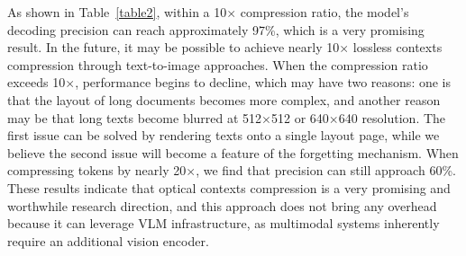 \documentclass[11pt, a4paper, logo, copyright, nonumbering]{deepseek}
\begin{document}
\begin{CJK*}{UTF8}{gbsn}
As shown in Table~\ref{table2}, within a 10$\times$ compression ratio, the model's decoding precision can reach approximately 97\%, which is a very promising result. In the future, it may be possible to achieve nearly 10$\times$ lossless contexts compression through text-to-image approaches. When the compression ratio exceeds 10$\times$, performance begins to decline, which may have two reasons: one is that the layout of long documents becomes more complex, and another reason may be that long texts become blurred at 512$\times$512 or 640$\times$640 resolution. The first issue can be solved by rendering texts onto a single layout page, while we believe the second issue will become a feature of the forgetting mechanism. When compressing tokens by nearly 20$\times$, we find that precision can still approach 60\%. These results indicate that optical contexts compression is a very promising and worthwhile research direction, and this approach does not bring any overhead because it can leverage VLM infrastructure, as multimodal systems inherently require an additional vision encoder.


\begin{table}[!h]\small
	\centering	
        
 	\caption{Edit distances for different categories of documents in OmniDocBench. The results show that some types of documents can achieve good performance with just 64 or 100 vision tokens, while others require Gundam mode.}
    \setlength{\abovecaptionskip}{0.2cm}
\end{table}
\end{CJK*}
\end{document}
